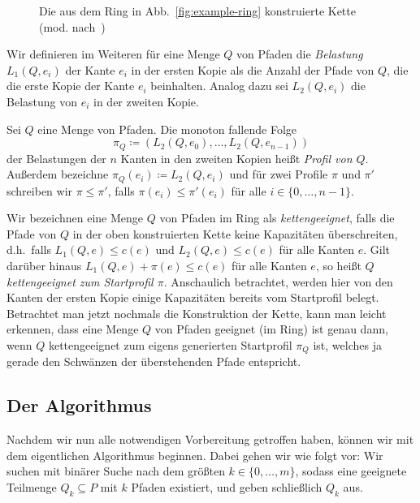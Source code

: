 \begin{figure}[htbp]
    \centering
    \def\svgwidth{270bp}
    
    \caption{Die aus dem Ring in Abb.~\ref{fig:example-ring} konstruierte Kette (mod. nach~\cite{paper})}
    \label{fig:example-ring-to-chain}
\end{figure}

Wir definieren im Weiteren für eine Menge $Q$ von Pfaden die {\em Belastung} $L_1(Q, e_i)$ der Kante
$e_i$ in der ersten Kopie als die Anzahl der Pfade von $Q$, die die erste Kopie der Kante $e_i$ beinhalten.
Analog dazu sei $L_2(Q, e_i)$ die Belastung von $e_i$ in der zweiten Kopie.
\begin{definition}[Profil]
    Sei $Q$ eine Menge von Pfaden.
    Die monoton fallende Folge
    \[\pi_{Q}\coloneqq  (L_2(Q, e_0), \dots, L_2(Q, e_{n-1}))\]
    der Belastungen der $n$ Kanten in den zweiten Kopien heißt {\em Profil von $Q$}.
    Außerdem bezeichne $\pi_Q(e_i) \coloneqq L_2(Q, e_i)$ und für zwei Profile $\pi$ und $\pi'$ schreiben wir $\pi \leq \pi'$,
    falls $\pi(e_i) \leq \pi'(e_i)$ für alle $i \in \{0,\dots,n-1\}$.
\end{definition}
Wir bezeichnen eine Menge $Q$ von Pfaden im Ring als {\em kettengeeignet},
falls die Pfade von $Q$ in der oben konstruierten Kette keine Kapazitäten überschreiten, d.h.\ falls $L_1(Q, e) \leq c(e)$ und
$L_2(Q, e) \leq c(e)$ für alle Kanten $e$.
Gilt darüber hinaus $L_1(Q, e) + \pi(e) \leq c(e)$ für alle Kanten $e$, so heißt $Q$ {\em kettengeeignet zum Startprofil $\pi$}.
Anschaulich betrachtet, werden hier von den Kanten der ersten Kopie einige Kapazitäten bereits vom Startprofil belegt.
Betrachtet man jetzt nochmals die Konstruktion der Kette, kann man leicht erkennen, dass eine Menge $Q$ von Pfaden geeignet
(im Ring) ist genau dann, wenn $Q$ kettengeeignet zum eigens generierten Startprofil $\pi_Q$ ist, welches ja gerade den
Schwänzen der überstehenden Pfade entspricht.

\subsection{Der Algorithmus}

Nachdem wir nun alle notwendigen Vorbereitung getroffen haben, können wir mit dem eigentlichen Algorithmus beginnen.
Dabei gehen wir wie folgt vor:
Wir suchen mit binärer Suche nach dem größten $k \in \{0, \dots, m\}$, sodass eine geeignete Teilmenge $Q_k \subseteq P$
mit $k$ Pfaden existiert, und geben schließlich $Q_k$ aus.

